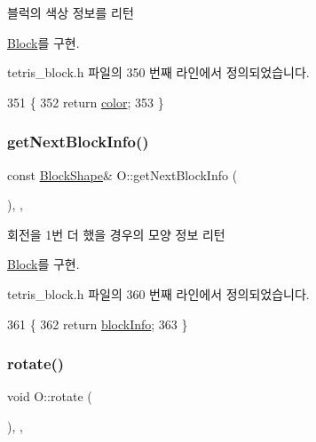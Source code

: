 블럭의 색상 정보를 리턴 



\mbox{\hyperlink{class_block_af10efef648f21dc708e42e149cd6fbcf}{Block}}를 구현.



tetris\+\_\+block.\+h 파일의 350 번째 라인에서 정의되었습니다.


\begin{DoxyCode}
351     \{
352         \textcolor{keywordflow}{return} \mbox{\hyperlink{class_o_a7005197d577eee8429ccaee14749e800}{color}};
353     \}
\end{DoxyCode}
\mbox{\label{class_o_a76a288c5f887c3b24cc6cb1c03bcd9b1}} 
\subsubsection{\texorpdfstring{get\+Next\+Block\+Info()}{getNextBlockInfo()}}
{\footnotesize\ttfamily const \mbox{\hyperlink{class_block_aca5d951639f113e2ebd7856209d6b9ab}{Block\+Shape}}\& O\+::get\+Next\+Block\+Info (\begin{DoxyParamCaption}{ }\end{DoxyParamCaption})\hspace{0.3cm}{\ttfamily [inline]}, {\ttfamily [override]}, {\ttfamily [virtual]}}



회전을 1번 더 했을 경우의 모양 정보 리턴 



\mbox{\hyperlink{class_block_a654da164e0493be9de6f2f2334bc73e8}{Block}}를 구현.



tetris\+\_\+block.\+h 파일의 360 번째 라인에서 정의되었습니다.


\begin{DoxyCode}
361     \{
362         \textcolor{keywordflow}{return} \mbox{\hyperlink{class_o_aff83495bf15903121bea8f8c5d7f2a11}{blockInfo}};
363     \}
\end{DoxyCode}
\mbox{\label{class_o_ae1c0b5ef6d51aa94765531f555b47cd0}} 
\subsubsection{\texorpdfstring{rotate()}{rotate()}}
{\footnotesize\ttfamily void O\+::rotate (\begin{DoxyParamCaption}{ }\end{DoxyParamCaption})\hspace{0.3cm}{\ttfamily [inline]}, {\ttfamily [override]}, {\ttfamily [virtual]}}




